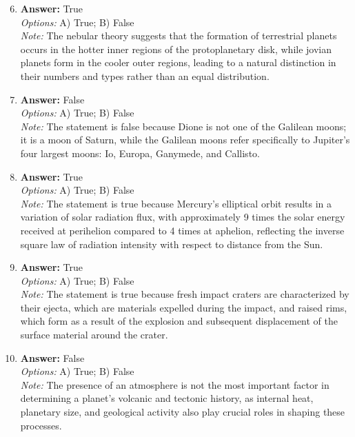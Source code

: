\documentclass[12pt]{article}
\begin{document}
\begin{enumerate}[label=\arabic*.]
\setcounter{enumi}{5}
\item \textbf{Answer:} True
\\ \textit{Options:} A) True; B) False
\\ \textit{Note:} The nebular theory suggests that the formation of terrestrial planets occurs in the hotter inner regions of the protoplanetary disk, while jovian planets form in the cooler outer regions, leading to a natural distinction in their numbers and types rather than an equal distribution.
\item \textbf{Answer:} False
\\ \textit{Options:} A) True; B) False
\\ \textit{Note:} The statement is false because Dione is not one of the Galilean moons; it is a moon of Saturn, while the Galilean moons refer specifically to Jupiter's four largest moons: Io, Europa, Ganymede, and Callisto.
\item \textbf{Answer:} True
\\ \textit{Options:} A) True; B) False
\\ \textit{Note:} The statement is true because Mercury's elliptical orbit results in a variation of solar radiation flux, with approximately 9 times the solar energy received at perihelion compared to 4 times at aphelion, reflecting the inverse square law of radiation intensity with respect to distance from the Sun.
\item \textbf{Answer:} True
\\ \textit{Options:} A) True; B) False
\\ \textit{Note:} The statement is true because fresh impact craters are characterized by their ejecta, which are materials expelled during the impact, and raised rims, which form as a result of the explosion and subsequent displacement of the surface material around the crater.
\item \textbf{Answer:} False
\\ \textit{Options:} A) True; B) False
\\ \textit{Note:} The presence of an atmosphere is not the most important factor in determining a planet's volcanic and tectonic history, as internal heat, planetary size, and geological activity also play crucial roles in shaping these processes.
\end{enumerate}
\end{document}
